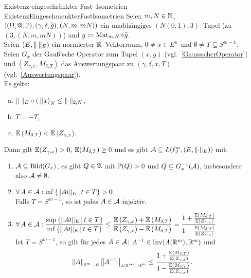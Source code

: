 \begin{satz}{Existenz eingeschränkter Fast--Isometrien}
            {ExistenzEingeschraenkterFastIsometrien}
Seien $m, N \in \mathbb{N}$,
$((\Omega, \mathfrak{A}, \mathbb{P}), (\gamma, \delta, \widetilde g), (N, m, mN))$
ein unabhängiges $(N(0,1),3)$--Tupel (zu $(3, (N, m, mN))$) und
$g\coloneqq \mathop{\textrm{Mat}}\nolimits_{m,N} \circ \widetilde g$.\\
Seien $(E, \lVert\cdot\rVert_E)$ ein normierter $\mathbb{R}$--Vektorraum,
$0\neq x \in E^n$ und $\emptyset \neq T \subseteq S^{m-1}$.\\
Seien $G_x$ der Gauß'sche Operator zum Tupel $(x,g)$ 
(vgl.~\ref{GaussscherOperator}) und $(Z_{\gamma,x}, M_{\delta, T})$ das
Auswertungspaar zu $(\gamma, \delta, x, T)$ (vgl.~\ref{Auswertungspaar}).\\
Es gelte:
\begin{enumerate}[(a)]
	\item $\lVert\cdot\rVert_E \circ \left\langle \cdot ||x\right\rangle _N \le \lVert\cdot\rVert_{2, N}$,
	\item $T = -T$,
	\item $\mathbb{E}\left(M_{\delta, T}\right) < \mathbb{E}\left(Z_{\gamma, x} \right)$.
\end{enumerate}
Dann gilt $\mathbb{E}(Z_{\gamma, x}) > 0$, $\mathbb{E}(M_{\delta, T}) \ge 0$ und es gibt 
$\mathcal{A} \subseteq L(\ell_2^m, (E, \lVert\cdot\rVert_E))$ mit:
\begin{enumerate}[(1)]
  \item\label{ExistenzEingeschraenkterFastIsometrien1}
  $\mathcal{A} \subseteq \mathop{\textrm{Bild}}\nolimits(G_x)$, es gibt $Q \in \mathfrak{A}$ mit $\mathbb{P}(Q)>0$ und
  $Q \subseteq G_x^{-1}(\mathcal{A})$, insbesondere also $\mathcal{A} \neq \emptyset$.
	\item \label{ExistenzEingeschraenkterFastIsometrien2}
	$\forall\, A \in \mathcal{A}: \inf\left\{\lVert At\rVert_E\,|\,t \in T\right\} > 0$\\
	Falls $T = S^{m-1}$, so ist jedes $A \in \mathcal{A}$ injektiv.
	\item \label{ExistenzEingeschraenkterFastIsometrien3}
	$\forall\, A \in \mathcal{A}:
	\dfrac{\sup\left\{\lVert At\rVert_E\,|\,t \in T\right\}}{\inf\left\{\lVert At\rVert_E\,|\,t \in T\right\}}
	\le \dfrac{\mathbb{E}\left(Z_{\gamma, x} \right) + \mathbb{E}\left(M_{\delta, T}\right)}
	{\mathbb{E}\left(Z_{\gamma, x} \right) - \mathbb{E}\left(M_{\delta, T}\right)}
	=\dfrac{1 + \frac{\mathbb{E}(M_{\delta, T})}{\mathbb{E}(Z_{\gamma, x})}}
	       {1 - \frac{\mathbb{E}(M_{\delta, T})}{\mathbb{E}(Z_{\gamma, x})}}$\\
	Ist $T = S^{m-1}$, so gilt für jedes $A \in \mathcal{A}$: 
	$A^{-1}\in \mathop{\textrm{Inv}}\nolimits(A(\mathbb{R}^m),\mathbb{R}^m)$ und
	\[\left\|A\right\|_{\scriptscriptstyle{\ensuremath{\mathbb{R}}^m \rightarrow E}} \left\|A^{-1}\right\|_{\scriptscriptstyle{A(\ensuremath{\mathbb{R}}^m) \rightarrow \ensuremath{\mathbb{R}}^m}}
	\le \dfrac{1 + \frac{\mathbb{E}(M_{\delta, T})}{\mathbb{E}(Z_{\gamma, x})}}
	       {1 - \frac{\mathbb{E}(M_{\delta, T})}{\mathbb{E}(Z_{\gamma, x})}}\text.\]

\end{enumerate}
\end{satz}

